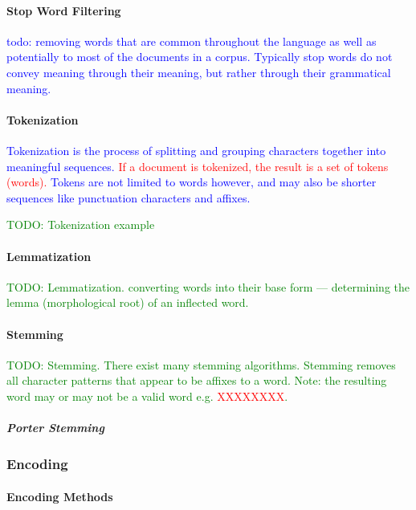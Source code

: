 \paragraph{Stop Word Filtering}

\textcolor{blue}{todo: removing words that are common throughout the language as well as potentially to most of the documents in a corpus. Typically stop words do not convey meaning through their meaning, but rather through their grammatical meaning.}

\paragraph{Tokenization}

\textcolor{blue}{Tokenization is the process of splitting and grouping characters together into meaningful sequences. \textcolor{red}{If a document is tokenized, the result is a set of tokens (words).} Tokens are not limited to words however, and may also be shorter sequences like punctuation characters and affixes.}

\textcolor{green}{TODO: Tokenization example}

\paragraph{Lemmatization}

\textcolor{green}{TODO: Lemmatization. converting words into their base form --- determining the lemma (morphological root) of an inflected word.}

\paragraph{Stemming}

\textcolor{green}{TODO: Stemming. There exist many stemming algorithms. Stemming removes all character patterns that appear to be affixes to a word. Note: the resulting word may or may not be a valid word e.g. \textcolor{red}{XXXXXXXX}.}

\subparagraph{Porter Stemming}

\subsubsection{Encoding}

\paragraph{Encoding Methods}

